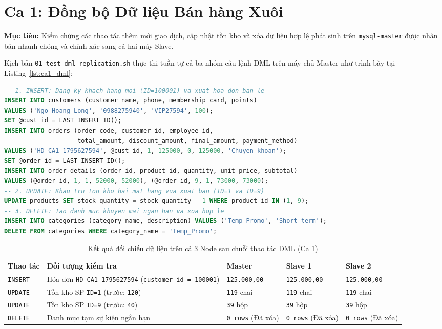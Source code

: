\documentclass[12pt,a4paper]{report}
\begin{document}
\section{Ca 1: Đồng bộ Dữ liệu Bán hàng Xuôi}
\textbf{Mục tiêu:} Kiểm chứng các thao tác thêm mới giao dịch, cập nhật tồn kho và xóa dữ liệu hợp lệ phát sinh trên \texttt{mysql-master} được nhân bản nhanh chóng và chính xác sang cả hai máy Slave.

Kịch bản \texttt{01\_test\_dml\_replication.sh} thực thi tuần tự cả ba nhóm câu lệnh DML trên máy chủ Master như trình bày tại Listing~\ref{lst:ca1_dml}:

\begin{lstlisting}[language=SQL, label={lst:ca1_dml}, caption={Chuỗi thao tác INSERT, UPDATE và DELETE thực thi trên Master (Ca 1)}]
-- 1. INSERT: Dang ky khach hang moi (ID=100001) va xuat hoa don ban le
INSERT INTO customers (customer_name, phone, membership_card, points)
VALUES ('Ngo Hoang Long', '0988275940', 'VIP27594', 100);
SET @cust_id = LAST_INSERT_ID();
INSERT INTO orders (order_code, customer_id, employee_id,
                    total_amount, discount_amount, final_amount, payment_method)
VALUES ('HD_CA1_1795627594', @cust_id, 1, 125000, 0, 125000, 'Chuyen khoan');
SET @order_id = LAST_INSERT_ID();
INSERT INTO order_details (order_id, product_id, quantity, unit_price, subtotal)
VALUES (@order_id, 1, 1, 52000, 52000), (@order_id, 9, 1, 73000, 73000);
-- 2. UPDATE: Khau tru ton kho hai mat hang vua xuat ban (ID=1 va ID=9)
UPDATE products SET stock_quantity = stock_quantity - 1 WHERE product_id IN (1, 9);
-- 3. DELETE: Tao danh muc khuyen mai ngan han va xoa hop le
INSERT INTO categories (category_name, description) VALUES ('Temp_Promo', 'Short-term');
DELETE FROM categories WHERE category_name = 'Temp_Promo';
\end{lstlisting}

\begin{table}[H]
\centering
\footnotesize
\caption{Kết quả đối chiếu dữ liệu trên cả 3 Node sau chuỗi thao tác DML (Ca 1)}
\label{tab:ca1_results}
\vspace{0.15cm}
\begin{tabularx}{\textwidth}{L{1.9cm} Y L{2.8cm} L{2.8cm} L{2.8cm}}
\toprule
\textbf{Thao tác} & \textbf{Đối tượng kiểm tra} & \textbf{Master} & \textbf{Slave 1} & \textbf{Slave 2} \\
\midrule
\texttt{INSERT} & Hóa đơn \texttt{HD\_CA1\_1795627594} (\texttt{customer\_id = 100001}) & \texttt{125.000,00} & \texttt{125.000,00} & \texttt{125.000,00} \\
\texttt{UPDATE} & Tồn kho SP \texttt{ID=1} (trước: \texttt{120}) & \texttt{119} chai & \texttt{119} chai & \texttt{119} chai \\
\texttt{UPDATE} & Tồn kho SP \texttt{ID=9} (trước: \texttt{40}) & \texttt{39} hộp & \texttt{39} hộp & \texttt{39} hộp \\
\texttt{DELETE} & Danh mục tạm sự kiện ngắn hạn & \texttt{0 rows} (Đã xóa) & \texttt{0 rows} (Đã xóa) & \texttt{0 rows} (Đã xóa) \\
\bottomrule
\end{tabularx}
\end{table}
\end{document}
